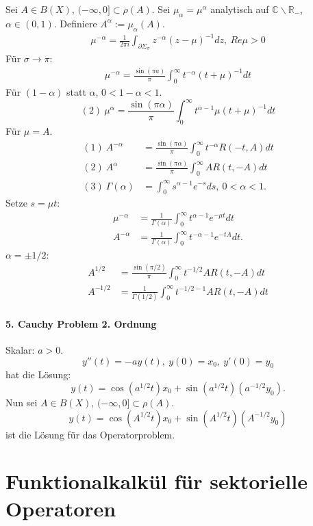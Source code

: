 \documentclass[12pt]{extreport} %
\numberwithin{equation}{section}
\newcommand{\C}{\mathbb{C}} %
\newcommand{\R}{\mathbb{R}} %
\begin{document}
	Sei $A\in B(X)$, $(-\infty,0] \subset \rho(A)$. Sei $\mu_\alpha = \mu^\alpha$ analytisch auf $\C\backslash\R_-$, $\alpha\in (0,1)$. Definiere $A^\alpha:= \mu_\alpha(A)$.
	\begin{align*}
		\mu^{-\alpha} = \frac{1}{2\pi i}\int_{\partial \Sigma_\sigma} z^{-\alpha} (z-\mu)^{-1}dz, ~ Re\mu> 0
	\end{align*}
	Für $\sigma\rightarrow \pi$:
	\begin{align*}
		\mu^{-\alpha} = \frac{\sin(\pi a)}{\pi} \int_{0}^{\infty} t^{-\alpha} (t+\mu)^{-1}dt
	\end{align*}
	Für $(1-\alpha)$ statt $\alpha$, $0<1-\alpha < 1$. 
	$$(2)~ \mu^{\alpha} = \frac{\sin(\pi\alpha)}{\pi} \int_{0}^{\infty} t^{\alpha-1} \mu(t+\mu)^{-1}dt$$
	Für $\mu = A$.
	\begin{align*}
		(1)~A^{-\alpha} &= \frac{\sin(\pi\alpha)}{\pi}\int_{0}^{\infty} t^{-\alpha} R(-t,A)dt\\
		(2)~A^\alpha &= \frac{\sin(\pi\alpha)}{\pi} \int_{0}^{\infty} A R(t,-A)dt\\
		(3)~ \Gamma(\alpha) &= \int_{0}^{\infty} s^{\alpha-1} e^{-s} ds, ~ 0<\alpha<1.
	\end{align*}
	Setze $s = \mu t$: 
	\begin{align*}
		\mu^{-\alpha} &= \frac{1}{\Gamma(\alpha)}\int_{0}^{\infty} t^{\alpha-1} e^{-\mu t}dt\\
		A^{-\alpha} &= \frac{1}{\Gamma(\alpha)} \int_{0}^{\infty} t^{-\alpha-1} e^{-tA}dt.
	\end{align*}
	$\alpha = \pm1/2$:
	\begin{align*}
		A^{1/2} &= \frac{\sin(\pi/2)}{\pi} \int_{0}^{\infty} t^{-1/2} AR(t,-A)dt\\
		A^{-1/2} &= \frac{1}{\Gamma(1/2)} \int_{0}^{\infty} t^{-1/2-1} AR(t,-A)dt
	\end{align*}
	
	\paragraph{5. Cauchy Problem 2. Ordnung}
	Skalar: $a>0$. 
	$$y''(t) = -ay(t), ~ y(0) = x_0,~ y'(0) = y_0$$
	hat die Lösung:
	$$y(t) = \cos(a^{1/2}t)x_0 + \sin(a^{1/2}t)(a^{-1/2}y_0).$$
	Nun sei $A\in B(X)$, $(-\infty, 0]\subset \rho(A)$. 
	$$y(t) = \cos(A^{1/2}t) x_0 + \sin(A^{1/2}t)(A^{-1/2}y_0)$$
	ist die Lösung für das Operatorproblem.
	
	
	\section{Funktionalkalkül für sektorielle Operatoren}
	
\end{document}
